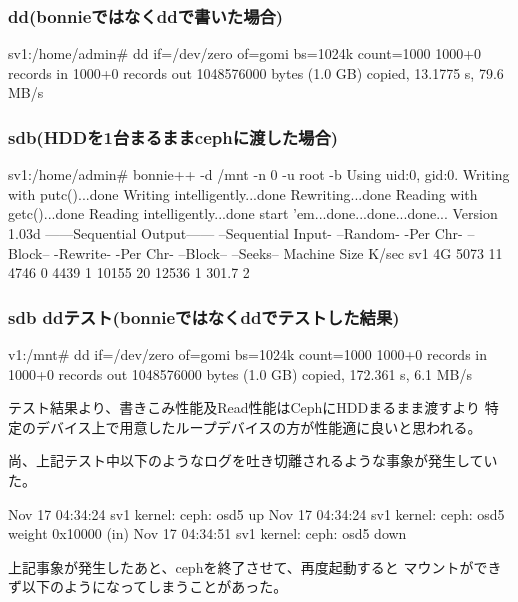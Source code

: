 \documentclass[mingoth,a4paper]{jsarticle}
\begin{document}
\subsubsection{dd(bonnieではなくddで書いた場合)}
\begin{commandline}
 sv1:/home/admin# dd if=/dev/zero of=gomi bs=1024k count=1000
 1000+0 records in
 1000+0 records out
 1048576000 bytes (1.0 GB) copied, 13.1775 s, 79.6 MB/s
\end{commandline}

\subsubsection{sdb(HDDを1台まるままcephに渡した場合)}
\begin{commandline}
 sv1:/home/admin# bonnie++ -d /mnt -n 0 -u root -b
 Using uid:0, gid:0.
 Writing with putc()...done
 Writing intelligently...done
 Rewriting...done
 Reading with getc()...done
 Reading intelligently...done
 start 'em...done...done...done...
 Version 1.03d       ------Sequential Output------ --Sequential Input- --Random-
                     -Per Chr- --Block-- -Rewrite- -Per Chr- --Block-- --Seeks--
 Machine        Size K/sec %
 sv1 4G  5073  11  4746   0  4439   1 10155  20 12536   1 301.7   2
\end{commandline}

\subsubsection{sdb ddテスト(bonnieではなくddでテストした結果)}
\begin{commandline}
 v1:/mnt# dd if=/dev/zero of=gomi bs=1024k count=1000
 1000+0 records in
 1000+0 records out
 1048576000 bytes (1.0 GB) copied, 172.361 s, 6.1 MB/s
\end{commandline}
テスト結果より、書きこみ性能及Read性能はCephにHDDまるまま渡すより
特定のデバイス上で用意したループデバイスの方が性能適に良いと思われる。

尚、上記テスト中以下のようなログを吐き切離されるような事象が発生していた。
\begin{commandline}
Nov 17 04:34:24 sv1 kernel: ceph: osd5 up
Nov 17 04:34:24 sv1 kernel: ceph: osd5 weight 0x10000 (in)
Nov 17 04:34:51 sv1 kernel: ceph: osd5 down
\end{commandline}

上記事象が発生したあと、cephを終了させて、再度起動すると
マウントができず以下のようになってしまうことがあった。
\end{document}
